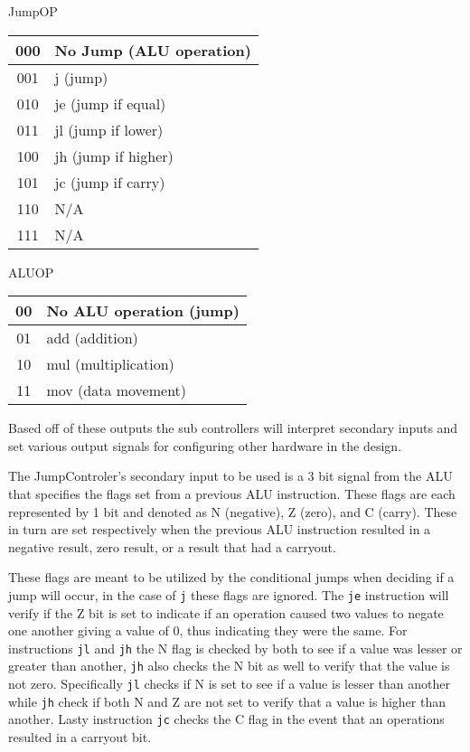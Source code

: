 \documentclass{article}
\begin{document}
JumpOP

\begin{center}
\begin{tabular}{|c|l|}
\hline
000 & No Jump (ALU operation) \\ \hline
001 & j (jump) \\ \hline
010 & je (jump if equal) \\ \hline
011 & jl (jump if lower) \\ \hline
100 & jh (jump if higher) \\ \hline
101 & jc (jump if carry) \\ \hline
110 & N/A \\ \hline
111 & N/A \\ \hline
\end{tabular}
\end{center}

ALUOP

\begin{center}
\begin{tabular}{|c|l|}
\hline
00 & No ALU operation (jump) \\ \hline
01 & add (addition) \\ \hline
10 & mul (multiplication) \\ \hline
11 & mov (data movement) \\ \hline
\end{tabular}
\end{center}

Based off of these outputs the sub controllers will interpret secondary inputs
and set various output signals for configuring other hardware in the design.

The JumpControler's secondary input to be used is a 3 bit signal from the ALU
that specifies the flags set from a previous ALU instruction.  These flags are
each represented by 1 bit and denoted as N (negative), Z (zero), and C (carry).
These in turn are set respectively when the previous ALU instruction resulted in
a negative result, zero result, or a result that had a carryout.

These flags are meant to be utilized by the conditional jumps when deciding if
a jump will occur, in the case of \texttt{j} these flags are ignored.  The
\texttt{je} instruction will verify if the Z bit is set to indicate if an
operation caused  two values to negate one another giving a value of 0, thus
indicating they were the same. For instructions \texttt{jl} and \texttt{jh} the
N flag is checked by both to see if a value was lesser or greater than another,
\texttt{jh} also checks the N bit as well to verify that the value is not zero.
Specifically \texttt{jl} checks if N is set to see if a value is lesser than
another while \texttt{jh} check if both N and Z are not set to verify that a
value is higher than another.  Lasty instruction \texttt{jc} checks the C flag
in the event that an operations resulted in a carryout bit.
\end{document}
